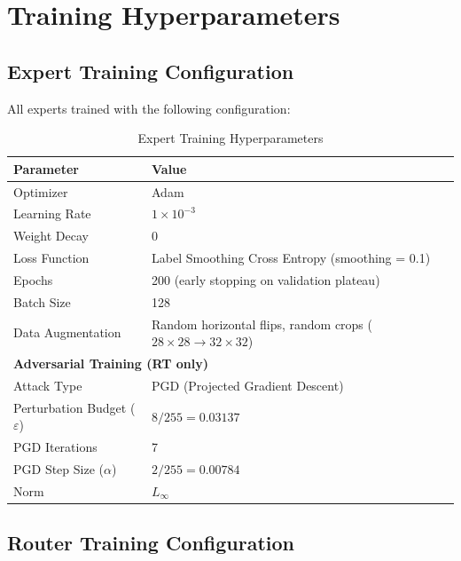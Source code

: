 \documentclass[11pt,a4paper]{article}
\begin{document}
\section{Training Hyperparameters}

\subsection{Expert Training Configuration}

All experts trained with the following configuration:

\begin{table}[H]
\centering
\begin{tabular}{ll}
\toprule
\textbf{Parameter} & \textbf{Value} \\
\midrule
Optimizer & Adam \\
Learning Rate & $1 \times 10^{-3}$ \\
Weight Decay & 0 \\
Loss Function & Label Smoothing Cross Entropy (smoothing = 0.1) \\
Epochs & 200 (early stopping on validation plateau) \\
Batch Size & 128 \\
Data Augmentation & Random horizontal flips, random crops ($28 \times 28 \to 32 \times 32$) \\
\midrule
\multicolumn{2}{l}{\textbf{Adversarial Training (RT only)}} \\
\midrule
Attack Type & PGD (Projected Gradient Descent) \\
Perturbation Budget ($\varepsilon$) & $8/255 = 0.03137$ \\
PGD Iterations & 7 \\
PGD Step Size ($\alpha$) & $2/255 = 0.00784$ \\
Norm & $L_\infty$ \\
\bottomrule
\end{tabular}
\caption{Expert Training Hyperparameters}
\end{table}

\subsection{Router Training Configuration}
\end{document}
